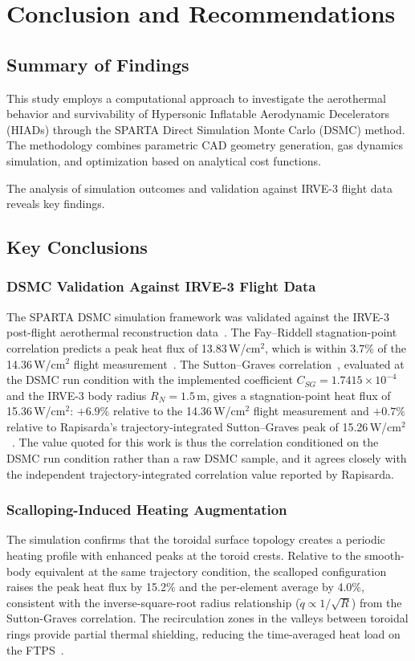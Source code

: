 \chapter{Conclusion and Recommendations}

\section{Summary of Findings}
This study employs a computational approach to investigate the aerothermal behavior and survivability of Hypersonic Inflatable Aerodynamic Decelerators (HIADs) through the SPARTA Direct Simulation Monte Carlo (DSMC) method. The methodology combines parametric CAD geometry generation, gas dynamics simulation, and optimization based on analytical cost functions.

The analysis of simulation outcomes and validation against IRVE-3 flight data reveals key findings.

\section{Key Conclusions}

\subsection{DSMC Validation Against IRVE-3 Flight Data}
The SPARTA DSMC simulation framework was validated against the IRVE-3 post-flight aerothermal reconstruction data~\cite{lau2013irve3}. The Fay--Riddell stagnation-point correlation predicts a peak heat flux of 13.83\,W/cm$^2$, which is within 3.7\% of the 14.36\,W/cm$^2$ flight measurement~\cite{rapisarda2023mdao}. The Sutton--Graves correlation~\cite{sutton1971gravesh}, evaluated at the DSMC run condition with the implemented coefficient $C_{SG} = 1.7415 \times 10^{-4}$ and the IRVE-3 body radius $R_N = 1.5$\,m, gives a stagnation-point heat flux of 15.36\,W/cm$^2$: $+6.9\%$ relative to the 14.36\,W/cm$^2$ flight measurement and $+0.7\%$ relative to Rapisarda's trajectory-integrated Sutton--Graves peak of 15.26\,W/cm$^2$~\cite{rapisarda2023mdao}. The value quoted for this work is thus the correlation conditioned on the DSMC run condition rather than a raw DSMC sample, and it agrees closely with the independent trajectory-integrated correlation value reported by Rapisarda.

\subsection{Scalloping-Induced Heating Augmentation}
The simulation confirms that the toroidal surface topology creates a periodic heating profile with enhanced peaks at the toroid crests. Relative to the smooth-body equivalent at the same trajectory condition, the scalloped configuration raises the peak heat flux by 15.2\% and the per-element average by 4.0\%, consistent with the inverse-square-root radius relationship ($\dot{q} \propto 1/\sqrt{R}$) from the Sutton-Graves correlation. The recirculation zones in the valleys between toroidal rings provide partial thermal shielding, reducing the time-averaged heat load on the FTPS~\cite{hollis2018surface}.

